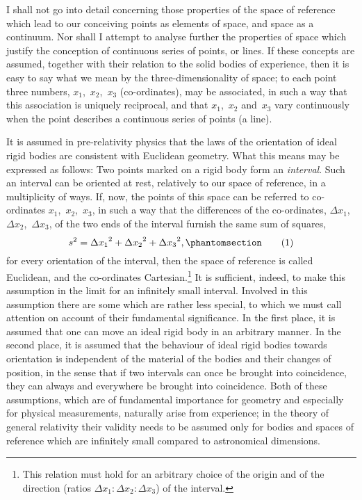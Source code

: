 \documentclass[12pt]{book}[2005/09/16]
\newcommand{\Change}[2]{#2}
\newcommand{\Add}[1]{\Change{}{#1}}
\newcommand{\PageSep}[1]{\ignorespaces}
\newcommand{\Tag}[1]{%
  \phantomsection
  \label{eqn:#1}
  \tag*{#1}
}
\begin{document}
I shall not go into detail concerning those properties
of the space of reference which lead to our conceiving
points as elements of space, and space as a continuum.
Nor shall I attempt to analyse further the properties of
space which justify the conception of continuous series
of points, or lines. If these concepts are assumed, together
with their relation to the solid bodies of experience, then
it is easy to say what we mean by the three-dimensionality
of space; to each point three numbers, $x_{1}$,~$x_{2}$,~$x_{3}$ (co-ordinates),
may be associated, in such a way that this
association is uniquely reciprocal, and that $x_{1}$,~$x_{2}$\Change{,}{} and~$x_{3}$
vary continuously when the point describes a continuous
series of points (a line).

It is assumed in pre-relativity physics that the laws of
the orientation of ideal rigid bodies are consistent with
Euclidean geometry. What this means may be expressed
%
%
as follows: Two points marked on a rigid body form
an \emph{interval}. Such an interval can be oriented at rest,
relatively to our space of reference, in a multiplicity of
ways. If, now, the points of this space can be referred
to co-ordinates $x_{1}$,~$x_{2}$,~$x_{3}$, in such a way that the differences
of the co-ordinates, $\Delta x_{1}$,~$\Delta x_{2}$,~$\Delta x_{3}$, of the two ends of the
interval furnish the same sum of squares,
\[
s^{2} = {\Delta x_{1}}^{2} + {\Delta x_{2}}^{2} + {\Delta x_{3}}^{2}\Add{,}
\Tag{(1)}
\]
\PageSep{5}
for every orientation of the interval, then the space of
reference is called Euclidean, and the co-ordinates
Cartesian.\footnote
  {This relation must hold for an arbitrary choice of the origin and of the
  direction (ratios $\Delta x_{1} : \Delta x_{2} : \Delta x_{3}$) of the interval.}
It is sufficient, indeed, to make this assumption
in the limit for an infinitely small interval. Involved
in this assumption there are some which are rather less
special, to which we must call attention on account of
their fundamental significance. In the first place, it is
assumed that one can move an ideal rigid body in an
arbitrary manner. In the second place, it is assumed
that the behaviour of ideal rigid bodies towards orientation
is independent of the material of the bodies and their
changes of position, in the sense that if two intervals can
once be brought into coincidence, they can always and
everywhere be brought into coincidence. Both of these
assumptions, which are of fundamental importance for
geometry and especially for physical measurements,
naturally arise from experience; in the theory of general
relativity their validity needs to be assumed only for
bodies and spaces of reference which are infinitely small
compared to astronomical dimensions.
\end{document}
